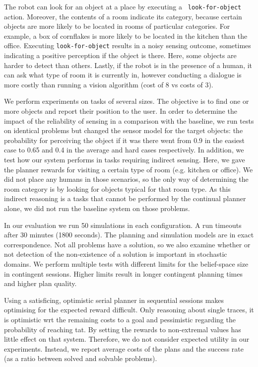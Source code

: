The robot can look for an object at a place by executing a {\tt
  look-for-object} action. Moreover, the contents of a room indicate
its category, because certain objects are more likely to be located in
rooms of particular categories. For example, a box of cornflakes is
more likely to be located in the kitchen than the office. Executing
{\tt look-for-object} results in a noisy sensing outcome, sometimes
indicating a positive perception if the object is there. Here, some
objects are harder to detect than others. Lastly, if the robot is in
the presence of a human, it can ask what type of room it is currently
in, however conducting a dialogue is more costly than running a vision
algorithm (cost of 8 vs costs of 3).


We perform experiments on tasks of several sizes. The objective is to
find one or more objects and report their position to the user. In
order to determine the impact of the reliability of sensing in a
comparison with the baseline, we run tests on identical problems but
changed the sensor model for the target objects: the probability for
perceiving the object if it was there went from 0.9 in the easiest
case to 0.65 and 0.4 in the average and hard cases respectively. In
addition, we test how our system performs in tasks requiring indirect
sensing. Here, we gave the planner rewards for visiting a certain type
of room (e.g. kitchen or office). We did not place any humans in those
scenarios, so the only way of determining the room category is by
looking for objects typical for that room type. As this indirect
reasoning is a tasks that cannot be performed by the continual planner
alone, we did not run the baseline system on those problems.



In our evaluation we run 50 simulations in each configuration. A run
timeouts after 30 minutes (1800 seconds). The planning and simulation
models are in exact correspondence. Not all problems have a solution,
so we also examine whether or not detection of the non-existence of a
solution is important in stochastic domains.
We perform multiple tests with different limits for the
belief-space size in contingent sessions.  Higher limits result in
longer contingent planning times and higher plan quality.


Using a satisficing, optimistic serial planner in sequential sessions
makes optimising for the expected reward difficult. Only reasoning
about single traces, it is optimistic wrt the remaining costs to a
goal and pessimistic regarding the probability of reaching tat. By
setting the rewards to non-extremal values has little effect on that
system. Therefore, we do not consider expected utility in our
experiments. Instead, we report average costs of the plans and the
success rate (as a ratio between solved and solvable problems).

